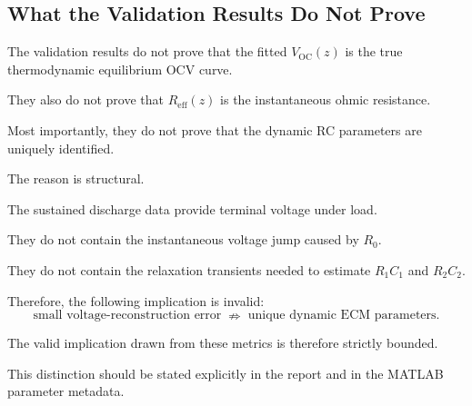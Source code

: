 \documentclass[a4paper,12pt]{article}
\begin{document}
\subsection{What the Validation Results Do Not Prove}

The validation results do not prove that the fitted \(V_{\mathrm{OC}}(z)\) is the true thermodynamic equilibrium OCV curve.

They also do not prove that \(R_{\mathrm{eff}}(z)\) is the instantaneous ohmic resistance.

Most importantly, they do not prove that the dynamic RC parameters are uniquely identified.

The reason is structural.

The sustained discharge data provide terminal voltage under load.

They do not contain the instantaneous voltage jump caused by \(R_0\).

They do not contain the relaxation transients needed to estimate \(R_1C_1\) and \(R_2C_2\).

Therefore, the following implication is invalid:
\begin{equation}
\text{small voltage-reconstruction error}
\;\nRightarrow\;
\text{unique dynamic ECM parameters}.
\label{eq:interp_invalid_implication}
\end{equation}

The valid implication drawn from these metrics is therefore strictly bounded.

\begin{center}

\end{center}

This distinction should be stated explicitly in the report and in the MATLAB parameter metadata.

\end{document}

